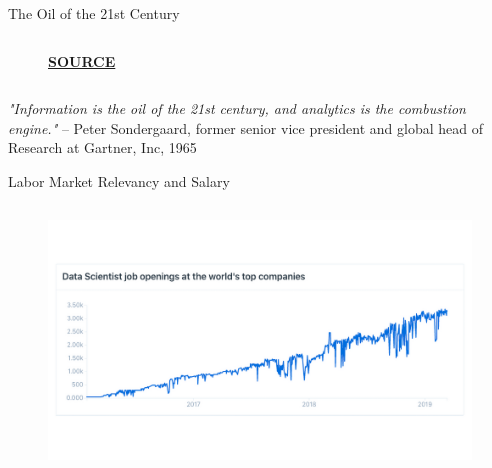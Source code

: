\documentclass[main.tex]{subfiles}
\begin{document}
\begin{frame}{The Oil of the 21st Century}
\begin{columns}
\begin{column}{.5\textwidth}
\begin{figure}
                    \tiny{\textbf{\href{https://deviq.io/resources/articles/feeling-overwhelmed-by-a-deluge-of-iot-data-iot-data-analytics-dashboards-can-help/}{SOURCE}}}
                \end{figure}
            \end{column}
        \end{columns}
        
        \begin{center}
            \textit{"Information is the oil of the 21st century, and analytics is the combustion engine."} – Peter Sondergaard, former senior vice president and global head of Research at Gartner, Inc, 1965
        \end{center}
    \end{frame}
    
    \begin{frame}{Labor Market Relevancy and Salary}
        \begin{columns}
            \begin{column}{.5\textwidth}
                \begin{figure}
                    \label{fig:job-openings}
                    \includegraphics[width=\textwidth,cframe=gray]{figures/external/job-openings.png}
                    

\end{figure}
\end{column}
\end{columns}
\end{frame}
\end{document}
